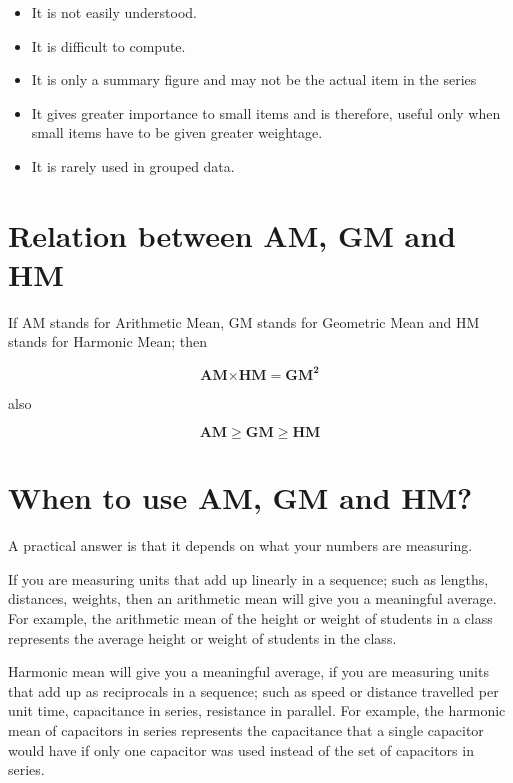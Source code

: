 \documentclass[
]{book}
\begin{document}
\begin{itemize}
\item
  It is not easily understood.
\item
  It is difficult to compute.
\item
  It is only a summary figure and may not be the actual item in the
  series
\item
  It gives greater importance to small items and is therefore, useful
  only when small items have to be given greater weightage.
\item
  It is rarely used in grouped data.
\end{itemize}

\hypertarget{relation-between-am-gm-and-hm}{%
\section{Relation between AM, GM and HM}\label{relation-between-am-gm-and-hm}}

If AM stands for Arithmetic Mean, GM stands for Geometric Mean and HM
stands for Harmonic Mean; then

\[\mathbf{\text{AM}}\mathbf{\times}\mathbf{\text{HM}}\mathbf{=}\mathbf{\text{GM}}^{\mathbf{2}}\]

also

\[\mathbf{AM \geq GM \geq HM}\]

\hypertarget{when-to-use-am-gm-and-hm}{%
\section{When to use AM, GM and HM?}\label{when-to-use-am-gm-and-hm}}

A practical answer is that it depends on what your numbers are
measuring.

If you are measuring units that add up linearly in a sequence; such as
lengths, distances, weights, then an arithmetic mean will give you a
meaningful average. For example, the arithmetic mean of the height or
weight of students in a class represents the average height or weight of
students in the class.

Harmonic mean will give you a meaningful average, if you are measuring
units that add up as reciprocals in a sequence; such as speed or
distance travelled per unit time, capacitance in series, resistance in
parallel. For example, the harmonic mean of capacitors in series
represents the capacitance that a single capacitor would have if only
one capacitor was used instead of the set of capacitors in series.
\end{document}
